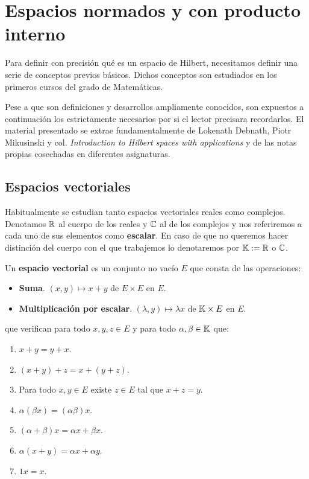 \chapter{Espacios normados y con producto interno}

Para definir con precisión qué es un espacio de Hilbert, necesitamos definir una serie de conceptos previos básicos. Dichos conceptos son estudiados en los primeros cursos del grado de Matemáticas.

Pese a que son definiciones y desarrollos ampliamente conocidos, son expuestos a continuación los estrictamente necesarios por si el lector precisara recordarlos. El material presentado se extrae fundamentalmente de Lokenath Debnath, Piotr Mikusinski y col. \textit{Introduction to Hilbert spaces with applications} y de las notas propias cosechadas en diferentes asignaturas.

\section{Espacios vectoriales}

Habitualmente se estudian tanto espacios vectoriales reales como complejos. Denotamos $\mathbb{R}$ al cuerpo de los reales y $\mathbb{C}$ al de los complejos y nos referiremos a cada uno de sus elementos como \textbf{escalar}. En caso de que no queremos hacer distinción del cuerpo con el que trabajemos lo denotaremos por $\mathbb{K}:=\mathbb{R}$ o $\mathbb{C}$.

\begin{definition} Un \textbf{espacio vectorial} es un conjunto no vacío $E$ que consta de las operaciones:
\begin{itemize}
\item \textbf{Suma}. $(x,y)\mapsto x+y$ de $E\times E$ en $E$.
\item \textbf{Multiplicación por escalar}. $(\lambda,y)\mapsto \lambda x$ de $\mathbb{K}\times E$ en $E$.
\end{itemize}
que verifican para todo $x,y,z\in E$ y para todo $\alpha,\beta\in\mathbb{K}$ que:
\begin{enumerate}[label=\alph*)]
\item $x + y = y + x$.
\item $(x + y) + z = x + (y + z)$.
\item Para todo $x,y\in E$ existe $z\in E$ tal que $x+z=y$.
\item $\alpha(\beta x)=(\alpha\beta)x$.
\item $(\alpha + \beta)x=\alpha x +\beta x$.
\item $\alpha (x + y) =\alpha x +\alpha y$.
\item $1x = x$.
\end{enumerate}
\end{definition}

